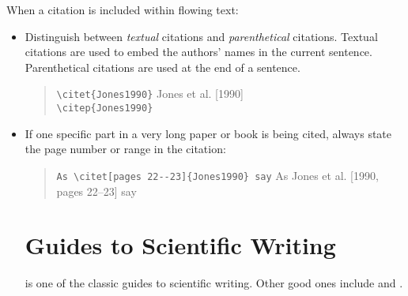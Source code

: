 When a citation is included within flowing text:
\begin{itemize}
\item Distinguish between \emph{textual} citations and
  \emph{parenthetical} citations. Textual citations are used to embed
  the authors' names in the current sentence. Parenthetical citations
  are used at the end of a sentence.
\begin{quote}
\verb|\citet{Jones1990}| \rightarrowsym Jones et al. [1990] \\
\verb|\citep{Jones1990}| \rightarrowsym [Jones et al., 1990]
\end{quote}


\item If one specific part in a very long paper or book is being
  cited, always state the page number or range in the citation:
\begin{quote}
\verb|As \citet[pages 22--23]{Jones1990} say| \rightarrowsym As Jones et al. [1990, pages 22–23] say\\
\end{quote}





\section{Guides to Scientific Writing}

\citet{CraftScientificWriting} is one of the classic guides to
scientific writing. Other good ones include \citet{BoothCraft}
and \citet{BoothCommunicating}.



\end{itemize}

